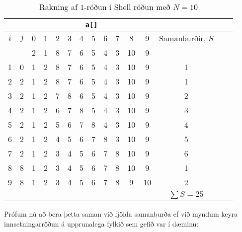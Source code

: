 \documentclass[12pt, a4paper, hidelinks]{article}
\begin{document}
\newpage

\begin{table}[ht!]
    \centering
    \begin{tabular}[pos]{cc|ccccccccccccc}
    \multicolumn{2}{c}{} & \multicolumn{10}{c}{\texttt{a[]}} \\
    \toprule
    $i$ & $j$ & 0 & 1 & 2 & 3 & 4 & 5 & 6 & 7 & 8  & 9 & Samanburðir, $S$ \\
    \midrule
        &     & 2 & 1 & 8 & 7 & 6 & 5 & 4 & 3 & 10 & 9 \\
    1   & 0   & \color{red}  1 & 2 & \color{lightgray} 8 & \color{lightgray} 7 & \color{lightgray} 6 & \color{lightgray} 5 & \color{lightgray} 4 & \color{lightgray} 3 & \color{lightgray} 10 & \color{lightgray} 9 & 1\\
    2   & 2   & \color{lightgray} 1 & \color{lightgray}  2 & \color{red} 8 & \color{lightgray} 7 & \color{lightgray} 6 & \color{lightgray} 5 & \color{lightgray} 4 & \color{lightgray} 3 & \color{lightgray} 10 & \color{lightgray} 9 & 1 \\
    3   & 2   & \color{lightgray} 1 & \color{lightgray}  2 & \color{red} 7 & 8 & \color{lightgray} 6 & \color{lightgray} 5 & \color{lightgray} 4 & \color{lightgray} 3 & \color{lightgray} 10 & \color{lightgray} 9 & 2\\
    4   & 2   & \color{lightgray} 1 & \color{lightgray}  2 & \color{red} 6 & 7 & 8 & \color{lightgray} 5 & \color{lightgray} 4 & \color{lightgray} 3 & \color{lightgray} 10 & \color{lightgray} 9 & 3 \\ 
    5   & 2   & \color{lightgray} 1 & \color{lightgray}  2 & \color{red} 5 & 6 & 7 & 8 & \color{lightgray} 4 & \color{lightgray} 3 & \color{lightgray} 10 & \color{lightgray} 9 & 4 \\
    6   & 2   & \color{lightgray} 1 & \color{lightgray}  2 & \color{red} 4 & 5 & 6 & 7 & 8 & \color{lightgray} 3 & \color{lightgray} 10 & \color{lightgray} 9 & 5 \\ 
    7   & 2   & \color{lightgray} 1 & \color{lightgray}  2 & \color{red} 3 & 4 & 5 & 6 & 7 & 8 & \color{lightgray} 10 & \color{lightgray} 9 & 6 \\
    8   & 8   & \color{lightgray} 1 & \color{lightgray} 2 & \color{lightgray} 3 & \color{lightgray} 4 & \color{lightgray} 5 & \color{lightgray} 6 & \color{lightgray} 7 & \color{lightgray}  8 & \color{red} 10 & \color{lightgray} 9 & 1\\
    9   & 8   & \color{lightgray} 1 & \color{lightgray} 2 & \color{lightgray} 3 & \color{lightgray} 4 & \color{lightgray} 5 & \color{lightgray} 6 & \color{lightgray} 7 & \color{lightgray}  8 & \color{red} 9 & 10 & 2 \\
    \midrule
    \multicolumn{12}{c}{} & $\sum S = 25$ \\
    \bottomrule
    \end{tabular}
    \caption{Rakning af $1$-röðun í Shell röðun með $N = 10$}
\end{table}
\noindent
Prófum nú að bera þetta saman við fjölda samanburða ef við myndum keyra innsetningarröðun á upprunalega fylkið
sem gefið var í dæminu:
\end{document}
